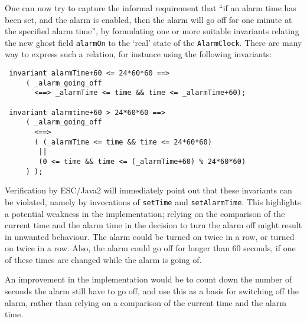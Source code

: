 \documentclass{llncs}
\begin{document}
% 

One can now try to capture the informal requirement that ``if an alarm time
has been set, and the alarm is enabled, then the alarm will go off for
one minute at the specified alarm time'', by formulating one or more
suitable invariants relating the new ghost field \texttt{alarmOn} to
the `real' state of the \texttt{AlarmClock}. There are many way to express
such a relation, for instance using the following invariants:
\begin{verbatim}
 invariant alarmTime+60 <= 24*60*60 ==> 
     ( _alarm_going_off 
       <==> _alarmTime <= time && time <= _alarmTime+60);

 invariant alarmtime+60 > 24*60*60 ==> 
     ( _alarm_going_off 
       <==> 
       ( (_alarmTime <= time && time <= 24*60*60)
        ||
        (0 <= time && time <= (_alarmTime+60) % 24*60*60) 
     ) );
\end{verbatim}
Verification by ESC/Java2 will immediately point out that these invariants
can be violated,
namely by invocations of \texttt{setTime} and  \texttt{setAlarmTime}.
This highlights a potential weakness in the implementation;
relying on the comparison of the current time and the alarm time
in the decision to turn the alarm off might result in unwanted behaviour. 
The alarm could be turned on twice in a row, or turned on twice in a row.
Also, the alarm could go off for longer than 60 seconds, if one of these times 
are changed while the alarm is going of.  


An improvement in the implementation would be to count down the number of 
seconds the alarm still have to go off, and use this as a basis for switching 
off the alarm, rather than relying on a comparison of the current time 
and the alarm time.
\end{document}
